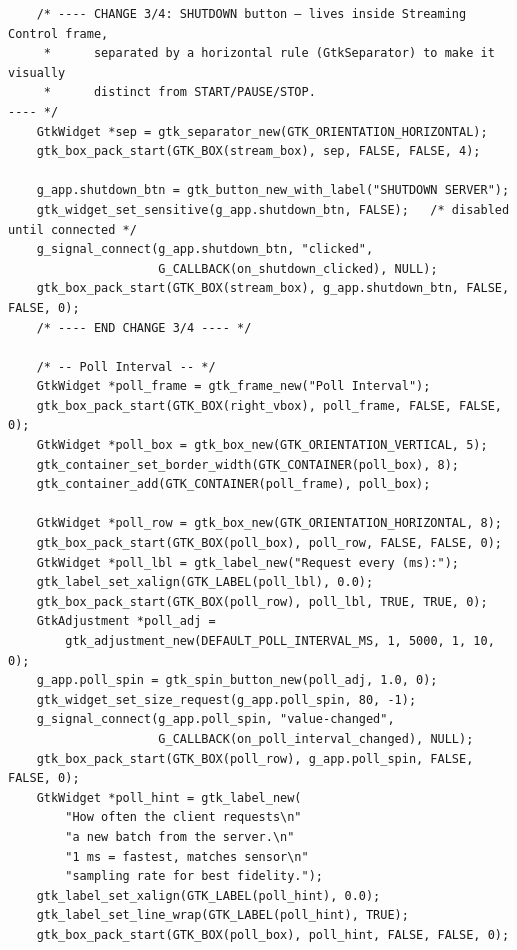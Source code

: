 \begin{verbatim}
    /* ---- CHANGE 3/4: SHUTDOWN button — lives inside Streaming Control frame,
     *      separated by a horizontal rule (GtkSeparator) to make it visually
     *      distinct from START/PAUSE/STOP.                                    ---- */
    GtkWidget *sep = gtk_separator_new(GTK_ORIENTATION_HORIZONTAL);
    gtk_box_pack_start(GTK_BOX(stream_box), sep, FALSE, FALSE, 4);

    g_app.shutdown_btn = gtk_button_new_with_label("SHUTDOWN SERVER");
    gtk_widget_set_sensitive(g_app.shutdown_btn, FALSE);   /* disabled until connected */
    g_signal_connect(g_app.shutdown_btn, "clicked",
                     G_CALLBACK(on_shutdown_clicked), NULL);
    gtk_box_pack_start(GTK_BOX(stream_box), g_app.shutdown_btn, FALSE, FALSE, 0);
    /* ---- END CHANGE 3/4 ---- */

    /* -- Poll Interval -- */
    GtkWidget *poll_frame = gtk_frame_new("Poll Interval");
    gtk_box_pack_start(GTK_BOX(right_vbox), poll_frame, FALSE, FALSE, 0);
    GtkWidget *poll_box = gtk_box_new(GTK_ORIENTATION_VERTICAL, 5);
    gtk_container_set_border_width(GTK_CONTAINER(poll_box), 8);
    gtk_container_add(GTK_CONTAINER(poll_frame), poll_box);

    GtkWidget *poll_row = gtk_box_new(GTK_ORIENTATION_HORIZONTAL, 8);
    gtk_box_pack_start(GTK_BOX(poll_box), poll_row, FALSE, FALSE, 0);
    GtkWidget *poll_lbl = gtk_label_new("Request every (ms):");
    gtk_label_set_xalign(GTK_LABEL(poll_lbl), 0.0);
    gtk_box_pack_start(GTK_BOX(poll_row), poll_lbl, TRUE, TRUE, 0);
    GtkAdjustment *poll_adj =
        gtk_adjustment_new(DEFAULT_POLL_INTERVAL_MS, 1, 5000, 1, 10, 0);
    g_app.poll_spin = gtk_spin_button_new(poll_adj, 1.0, 0);
    gtk_widget_set_size_request(g_app.poll_spin, 80, -1);
    g_signal_connect(g_app.poll_spin, "value-changed",
                     G_CALLBACK(on_poll_interval_changed), NULL);
    gtk_box_pack_start(GTK_BOX(poll_row), g_app.poll_spin, FALSE, FALSE, 0);
    GtkWidget *poll_hint = gtk_label_new(
        "How often the client requests\n"
        "a new batch from the server.\n"
        "1 ms = fastest, matches sensor\n"
        "sampling rate for best fidelity.");
    gtk_label_set_xalign(GTK_LABEL(poll_hint), 0.0);
    gtk_label_set_line_wrap(GTK_LABEL(poll_hint), TRUE);
    gtk_box_pack_start(GTK_BOX(poll_box), poll_hint, FALSE, FALSE, 0);


\end{verbatim}
